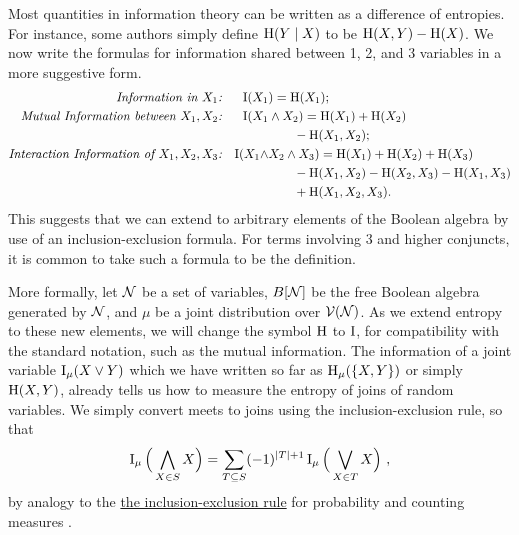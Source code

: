 \documentclass{article}
\begin{document}
    Most quantities in information theory can be written as a difference of entropies.
    For instance, some authors simply define $\operatorname{\mathrm{H}}(Y \mid X)$ to be $\operatorname{\mathrm{H}}(X,Y) - \operatorname{\mathrm{H}}(X)$.
    We now write the formulas for information shared between 1, 2, and 3 variables in a more suggestive form.
    \begin{align*}
        \textit{Information in $X_1$:}  && \operatorname{\mathrm{I}}(X_1 &) = \operatorname{\mathrm{H}}(X_1) ;\\
        \textit{Mutual Information between $X_1, X_2$:} && \operatorname{\mathrm{I}}(X_1 &\land X_2) = \operatorname{\mathrm{H}}(X_1) + \operatorname{\mathrm{H}}(X_2)  \\
             &&&\qquad - \operatorname{\mathrm{H}}(X_1, X_2); \\
         \textit{Interaction Information of $X_1, X_2, X_3$:}&&\operatorname{\mathrm{I}}(X_1 \land &X_2 \land X_3) = \operatorname{\mathrm{H}}(X_1) + \operatorname{\mathrm{H}}(X_2) + \operatorname{\mathrm{H}}(X_3) \\
            &&&\qquad - \operatorname{\mathrm{H}}(X_1, X_2) - \operatorname{\mathrm{H}}(X_2, X_3) - \operatorname{\mathrm{H}}(X_1, X_3) \\
            &&&\qquad  + \operatorname{\mathrm{H}}(X_1, X_2, X_3)  .\\
    \end{align*}
    This suggests that we can extend to arbitrary elements of the Boolean algebra by use of an inclusion-exclusion formula. For terms involving 3 and higher conjuncts, it is common to take such a formula to be the definition.

    More formally, let $\mathcal N$ be a set of variables, $B[\mathcal N]$ be the free Boolean algebra generated by $\mathcal N$, and $\mu$ be a joint distribution over $\mathcal V(\mathcal N)$. As we extend entropy to these new elements, we will change the symbol $\operatorname{\mathrm{H}}$ to $\operatorname{\mathrm{I}}$, for compatibility with the standard notation, such as the mutual information. The information of a joint variable $\operatorname{\mathrm{I}}_\mu(X \lor Y)$ which we have written so far as $\operatorname{\mathrm{H}}_\mu(\{X,Y\})$ or simply $\operatorname{\mathrm{H}}(X,Y)$, already tells us how to measure the entropy of joins of random variables. We simply convert meets to joins using the inclusion-exclusion rule, so that
    \begin{equation}\label{eq:inclexcl}
        \operatorname{\mathrm{I}}_\mu\Big(\bigwedge_{X \in S} X\Big) =  \sum_{T \subseteq S} (-1)^{|T|+1} \operatorname{\mathrm{I}}_\mu\Big( \bigvee_{X \in T} X \Big) ~,
    \end{equation}
    by analogy to the
    \href{https://en.wikipedia.org/wiki/Inclusion%E2%80%93exclusion_principle}
        {the inclusion-exclusion rule} for probability and counting measures \cite[eq 2.7]{halpern2017reasoning}.
\end{document}
